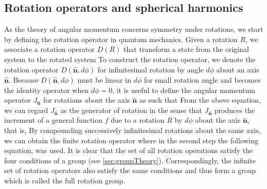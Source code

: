 \subsection{Rotation operators and spherical harmonics}

As the theory of angular
 momentum concerns  symmetry under rotations, we start by defining the rotation operator in quantum 
 mechanics. Given a rotation $R$, we associate a rotation operator 
 $D(R)$ that transform a state from the original system to the rotated system
To construct the rotation operator, we denote the rotation operator $D(\mathbf{\hat{n}}, d\phi)$ for infinitesimal 
rotation by angle $d\phi$ about an axis $\mathbf{\hat{n}}$. Because $D(\mathbf{\hat{n}}, d\phi)$ must be linear
in $d\phi$ for small rotation angle and becomes the identity operator when $d\phi = 0$, it is useful to define the angular
 momentum operator $J_{\mathbf{\hat{n}}}$ for rotations about the axis $\mathbf{\hat{n}}$ as 
such that
From the above equation, we can regard $J_{\mathbf{\hat{n}}}$ as the generator of rotation in the sense that $ J_{\mathbf{\hat{n}}}$ produces the increment of a general function $f$ due to a rotation $R$ 
by $d\phi$ about the axis $\mathbf{\hat{n}}$, that is,
By compounding successively infinitesimal rotations about the same axis, we can obtain the finite rotation operator
where in the second step the following equation,
was used. 
It is clear that the set of all rotation operations satisfy the four conditions of a group (see 
\autoref{sec:groupTheory}). Correspondingly, 
 the infinite set of rotation operators also satisfy the same conditions and thus form a group which is called the full 
rotation group. 


